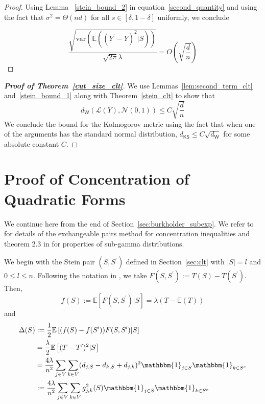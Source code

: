 \documentclass[final,12pt]{colt2018}
\begin{document}
\begin{proof}
Using Lemma ~\ref{stein_bound_2} in equation~\eqref{second_quantity} and using the fact that $\sigma^2 = \Theta(nd)$ for all $s \in [\delta,1-\delta]$ uniformly, we conclude 

\begin{equation}
 \frac{\sqrt{\mathrm{var}(\mathbb{E}((Y^{\prime}-Y)^2|S))}}{\sqrt{2\pi}\lambda} = O\left(\sqrt{\frac{d}{n}}\right)
 \label{stein_quantity_2}
\end{equation}
\end{proof}

\begin{proof}[\textbf{Proof of Theorem~\ref{cut_size_clt}}]
We use Lemmas~\ref{lem:second_term_clt} and~\ref{stein_bound_1} along with Theorem~\ref{stein_clt} to show that
$$d_{\mathsf{W}}(\mathcal{L}(Y), \mathcal{N}(0,1)) \leq C\sqrt{\frac{d}{n}}$$
We conclude the bound for the Kolmogorov metric using the fact that when one of the arguments has the standard normal distribution,
$d_{\mathsf{KS}} \leq C \sqrt{d_{\mathsf{W}}}$
for some absolute constant $C$.
\end{proof}


\section{Proof of Concentration of Quadratic Forms}
\label{sec: quadratic_form_concentration_proof}
We continue here from the end of Section~\ref{sec:burkholder_subexp}. We refer to \citet{chatterjee2007stein} for details of the exchangeable pairs method for concentration inequalities and theorem 2.3 in \citet{boucheron2013concentration} for properties of sub-gamma distributions.



We begin with the Stein pair $(S,S^{\prime})$ defined in Section~\ref{sec:clt} with $|S| = l$ and $0 \leq l \leq n$. Following the notation in \citet{chatterjee2007stein},  we take $F(S,S^{\prime}) := T(S) - T(S^{\prime})$. Then, 
$$f(S) := \mathbb{E}\left[F(S,S^{\prime})|S\right] = \lambda (T - \mathbb{E}(T))$$ and 
\begin{align}
\Delta(S) &:= \frac{1}{2}\mathbb{E}\left[(f(S) -f(S^{\prime}))F(S,S^{\prime})|S\right]\nonumber \\ 
&= \frac{\lambda}{2}\mathbb{E}\left[(T-T^{\prime})^2|S\right]\nonumber \\
&= \frac{4\lambda}{n^2}\sum_{j\in V}\sum_{k\in V} (d_{j,S} - d_{k,S}+d_{j,k})^2 \mathbbm{1}_{j\in S}\mathbbm{1}_{k \in S^c} \nonumber \\
&:= \frac{4\lambda}{n^2} \sum_{j\in V}\sum_{k \in V} g_{j,k}^2(S)\mathbbm{1}_{j\in S}\mathbbm{1}_{k \in S^c}  \label{delta_definition}
\end{align}
\end{document}
